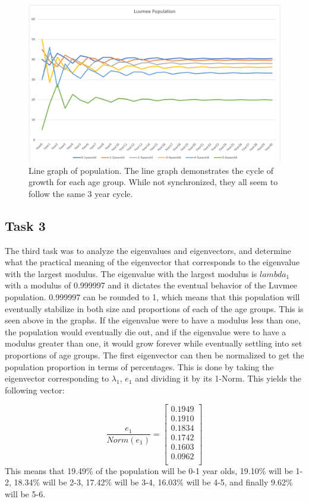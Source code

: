 \documentclass[12pt]{extarticle}
\begin{document}
\begin{figure}[ht!]
  \includegraphics[width=\linewidth]{PopulationGraph1.PNG}
  \caption{Line graph of population. The line graph demonstrates the cycle of growth for each age group. While not synchronized, they all seem to follow the same 3 year cycle. }
\end{figure}
\newpage
\subsection{Task 3}
The third task was to analyze the eigenvalues and eigenvectors, and determine what the practical meaning of the eigenvector that corresponds to the eigenvalue with the largest modulus. The eigenvalue with the largest modulus is $lambda_1$ with a modulus of 0.999997 and it dictates the eventual behavior of the Luvmee population. 0.999997 can be rounded to 1, which means that this population will eventually stabilize in both size and proportions of each of the age groups. This is seen above in the graphs. If the eigenvalue were to have a modulus less than one, the population would eventually die out, and if the eigenvalue were to have a modulus greater than one, it would grow forever while eventually settling into set proportions of age groups. 
\newline
The first eigenvector can then be normalized to get the population proportion in terms of percentages. This is done by taking the eigenvector corresponding to $\lambda_1$, $e_1$ and dividing it by its 1-Norm. This yields the following vector:

\[\frac{e_1}{Norm(e_1)} = \begin{bmatrix}
0.1949\\0.1910\\0.1834\\0.1742\\0.1603\\0.0962\\
\end{bmatrix}\]
\newline
This means that 19.49\% of the population will be 0-1 year olds, 19.10\% will be 1-2, 18.34\% will be 2-3, 17.42\% will be 3-4, 16.03\% will be 4-5, and finally 9.62\% will be 5-6. 
\end{document}
